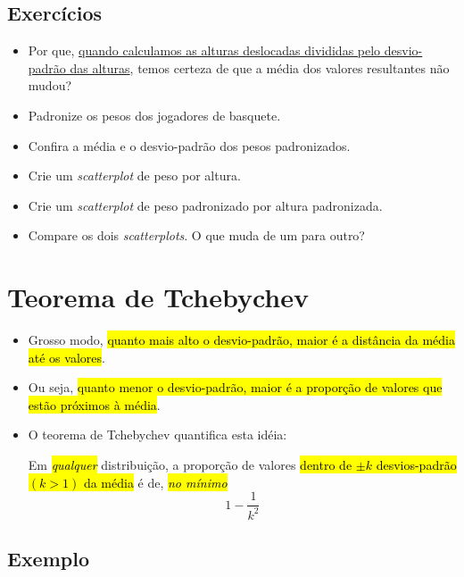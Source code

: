 \documentclass[
  11pt]{report}
\begin{document}
\hypertarget{exercuxedcios-12}{%
\subsection{Exercícios}\label{exercuxedcios-12}}

\begin{itemize}
\item
  Por que, \protect\hyperlink{dividir-por-sd}{quando calculamos as alturas deslocadas divididas pelo desvio-padrão das alturas}, temos certeza de que a média dos valores resultantes não mudou?
\item
  Padronize os pesos dos jogadores de basquete.
\item
  Confira a média e o desvio-padrão dos pesos padronizados.
\item
  Crie um \emph{scatterplot} de peso por altura.
\item
  Crie um \emph{scatterplot} de peso padronizado por altura padronizada.
\item
  Compare os dois \emph{scatterplots}. O que muda de um para outro?
\end{itemize}

\hypertarget{teorema-de-tchebychev}{%
\section{Teorema de Tchebychev}\label{teorema-de-tchebychev}}

\begin{itemize}
\item
  Grosso modo, {\hl{quanto mais alto o desvio-padrão, maior é a distância da média até os valores}}.
\item
  Ou seja, {\hl{quanto menor o desvio-padrão, maior é a proporção de valores que estão próximos à média}}.
\item
  O teorema de Tchebychev quantifica esta idéia:

  Em {\hl{\emph{qualquer}}} distribuição, a proporção de valores {\hl{dentro de $\pm k$ desvios-padrão $(k > 1)$ da média}} é de, {\hl{\emph{no mínimo}}}
  \[
  1 - \frac{1}{k^2}
  \]
\end{itemize}

\hypertarget{exemplo-2}{%
\subsection{Exemplo}\label{exemplo-2}}
\end{document}

